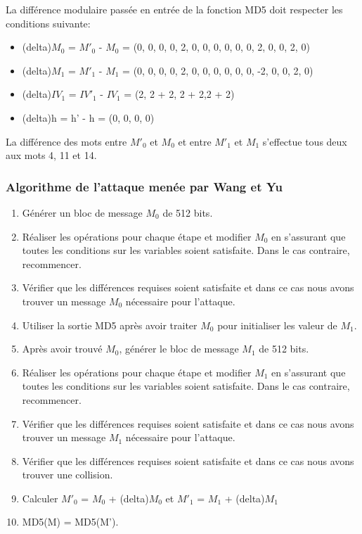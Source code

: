 \documentclass[a4paper,11pt,french]{article}
\begin{document}
La différence modulaire passée en entrée de la fonction MD5 doit respecter les conditions suivante:
\begin{itemize}
\item (delta)$M_{0}$ = $M'_{0}$ - $M_{0}$ = (0, 0, 0, 0, 2, 0, 0, 0, 0, 0, 0, 2, 0, 0, 2, 0)
\item (delta)$M_{1}$ = $M'_{1}$ - $M_{1}$ = (0, 0, 0, 0, 2, 0, 0, 0, 0, 0, 0, -2, 0, 0, 2, 0)
\item (delta)$IV_{1}$ = $IV'_{1}$ - $IV_{1}$ = (2, 2 + 2, 2 + 2,2 + 2)
\item (delta)h = h' - h = (0, 0, 0, 0)
\end{itemize}
\vspace{.5cm}
La différence des mots entre $M'_{0}$ et $M_{0}$ et entre $M'_{1}$ et $M_{1}$ s'effectue tous deux aux mots 4, 11 et 14.\\


\subsubsection{Algorithme de l'attaque menée par Wang et Yu}
\begin{enumerate}
 \item Générer un bloc de message $M_0$ de 512 bits.
 \item Réaliser les opérations pour chaque étape et modifier $M_0$ en s'assurant que toutes les conditions sur les variables soient satisfaite. Dans le cas contraire, recommencer.
 \item Vérifier que les différences requises soient satisfaite et dans ce cas nous avons trouver un message $M_0$ nécessaire pour l'attaque.
 \item Utiliser la sortie MD5 après avoir traiter $M_0$ pour initialiser les valeur de $M_1$.
 \item Après avoir trouvé $M_0$, générer le bloc de message $M_1$ de 512 bits.
 \item Réaliser les opérations pour chaque étape et modifier $M_1$ en s'assurant que toutes les conditions sur les variables soient satisfaite. Dans le cas contraire, recommencer.
 \item Vérifier que les différences requises soient satisfaite et dans ce cas nous avons trouver un message $M_1$ nécessaire pour l'attaque.
 \item Vérifier que les différences requises soient satisfaite et dans ce cas nous avons trouver une collision.
 \item Calculer $M'_0$ = $M_0$ + (delta)$M_0$ et $M'_1$ = $M_1$ + (delta)$M_1$
 \item MD5(M) = MD5(M').
\end{enumerate}
\end{document}
